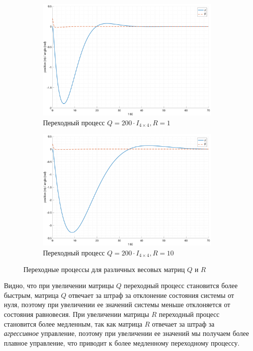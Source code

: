 \begin{figure}[ht!]
\begin{subfigure}[b]{0.45\textwidth}
        \includegraphics[width=\textwidth]{media/plots/LQR/out_8.png}
        \caption{Переходный процесс $Q = 200 \cdot I_{4\times 4}, R = 1$}
    \end{subfigure}
    \begin{subfigure}[b]{0.45\textwidth}
        \centering
        \includegraphics[width=\textwidth]{media/plots/LQR/out_9.png}
        \caption{Переходный процесс $Q = 200 \cdot I_{4\times 4}, R = 10$}
    \end{subfigure}
    \caption{Переходные процессы для различных весовых матриц $Q$ и $R$}
    \label{fig:lqr_controller_qr}
\end{figure} 
Видно, что при увеличении матрицы $Q$ переходный процесс становится более быстрым, матрица $Q$ отвечает 
за штраф за отклонение состояния системы от нуля, поэтому при увеличении ее значений системы меньше 
отклоняется от состояния равновесия. При увеличении матрицы $R$ переходный процесс становится более медленным,
так как матрица $R$ отвечает за штраф за \textit{агрессивное} управление, поэтому при увеличении ее значений 
мы получаем более плавное управление, что приводит к более медленному переходному процессу. 

